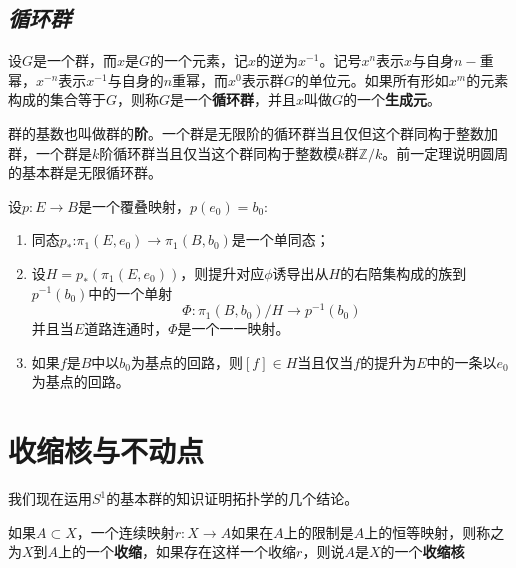 \subsection*{\textsl{循环群}}

\begin{define}
    设$G$是一个群，而$x$是$G$的一个元素，记$x$的逆为$x^{-1}$。记号$x^n$表示$x$与自身$n-$重幂，$x^{-n}$表示$x^{-1}$与自身的$n$重幂，而$x^0$表示群$G$的单位元。如果所有形如$x^m$的元素构成的集合等于$G$，则称$G$是一个\textbf{循环群}，并且$x$叫做$G$的一个\textbf{生成元}。
\end{define}

\vspace*{1em}

群的基数也叫做群的\textbf{阶}。一个群是无限阶的循环群当且仅但这个群同构于整数加群，一个群是$k$阶循环群当且仅当这个群同构于整数模$k$群$\mathbb{Z}/k$。前一定理说明圆周的基本群是无限循环群。

\begin{mdframed}
    \begin{theorem}
        设$p:E\rightarrow B$是一个覆叠映射，$p(e_0)=b_0$:
        \begin{enumerate}[itemindent=2em]
            \item 同态$p_*$:$\pi_1(E,e_0)\rightarrow \pi_1(B,b_0)$是一个单同态；
            \item 设$H=p_*(\pi_1(E,e_0))$，则提升对应$\phi$诱导出从$H$的右陪集构成的族到$p^{-1}(b_0)$中的一个单射
            \begin{equation}
                \Phi:\pi_1(B,b_0)/H\rightarrow p^{-1}(b_0)
            \end{equation}
            并且当$E$道路连通时，$\Phi$是一个一一映射。
            \item 如果$f$是$B$中以$b_0$为基点的回路，则$[f]\in H$当且仅当$f$的提升为$E$中的一条以$e_0$为基点的回路。
        \end{enumerate}
    \end{theorem}
\end{mdframed}

\section{收缩核与不动点}

我们现在运用$S^1$的基本群的知识证明拓扑学的几个结论。

\vspace*{1em}

\begin{define}
    如果$A\subset X$，一个连续映射$r:X\rightarrow A$如果在$A$上的限制是$A$上的恒等映射，则称之为$X$到$A$上的一个\textbf{收缩}，如果存在这样一个收缩$r$，则说$A$是$X$的一个\textbf{收缩核}
\end{define}


